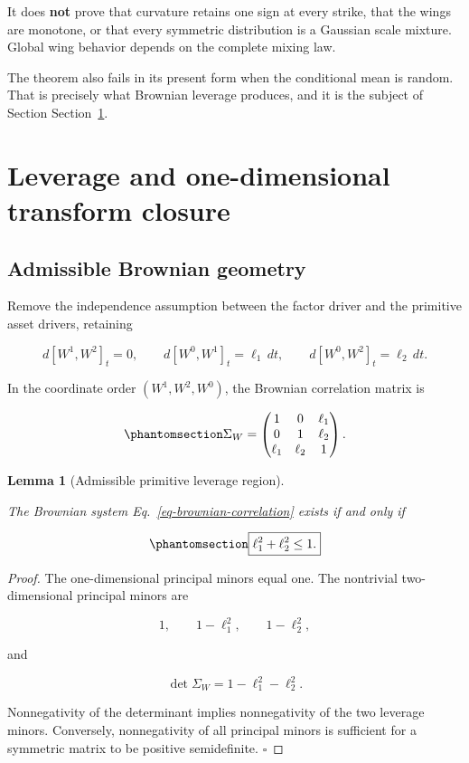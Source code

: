 \documentclass[
  english,
  11pt,
  letterpaper,
  DIV=11,
  numbers=noendperiod]{scrartcl}
\theoremstyle{plain}
\theoremstyle{plain}
\theoremstyle{plain}
\newtheorem{lemma}{Lemma}[section]
\theoremstyle{plain}
\theoremstyle{remark}
\begin{document}
It does \textbf{not} prove that curvature retains one sign at every
strike, that the wings are monotone, or that every symmetric
distribution is a Gaussian scale mixture. Global wing behavior depends
on the complete mixing law.

The theorem also fails in its present form when the conditional mean is
random. That is precisely what Brownian leverage produces, and it is the
subject of Section Section~\ref{sec-leverage}.

\section{Leverage and one-dimensional transform
closure}\label{sec-leverage}

\subsection{Admissible Brownian
geometry}\label{admissible-brownian-geometry}

Remove the independence assumption between the factor driver and the
primitive asset drivers, retaining

\[
d[W^1,W^2]_t=0,\qquad
d[W^0,W^1]_t=\ell_1\,dt,\qquad
d[W^0,W^2]_t=\ell_2\,dt.
\]

In the coordinate order \((W^1,W^2,W^0)\), the Brownian correlation
matrix is

\begin{equation}\protect\phantomsection\label{eq-brownian-correlation}{
\Sigma_W=
\begin{pmatrix}
1&0&\ell_1\\
0&1&\ell_2\\
\ell_1&\ell_2&1
\end{pmatrix}.
}\end{equation}

\begin{lemma}[Admissible primitive leverage
region]\protect\hypertarget{lem-leverage-psd}{}\label{lem-leverage-psd}

The Brownian system Eq.~\ref{eq-brownian-correlation} exists if and only
if

\begin{equation}\protect\phantomsection\label{eq-leverage-disc}{
\boxed{\ell_1^2+\ell_2^2\le1.}
}\end{equation}

\end{lemma}

\begin{proof}
The one-dimensional principal minors equal one. The nontrivial
two-dimensional principal minors are

\[
1,\qquad 1-\ell_1^2,\qquad 1-\ell_2^2,
\]

and

\[
\det\Sigma_W=1-\ell_1^2-\ell_2^2.
\]

Nonnegativity of the determinant implies nonnegativity of the two
leverage minors. Conversely, nonnegativity of all principal minors is
sufficient for a symmetric matrix to be positive semidefinite.
\(\square\)
\end{proof}
\end{document}

